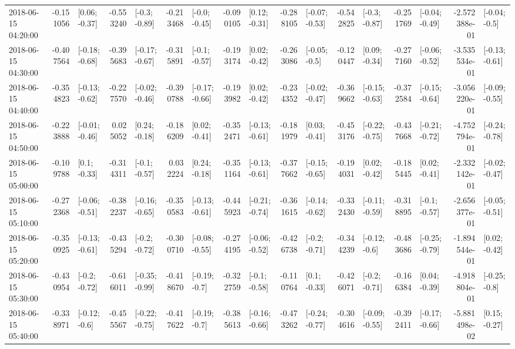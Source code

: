 \begin{tabular}{lrlrlrlrlrlrlrlrl}
2018-06-15 04:20:00 & -0.151056 &   [0.06; -0.37] & -0.553240 &   [-0.3; -0.89] & -0.213468 &   [-0.0; -0.45] & -0.090105 &   [0.12; -0.31] & -0.288105 &  [-0.07; -0.53] & -0.542825 &   [-0.3; -0.87] & -0.251769 &  [-0.04; -0.49] & -2.572388e-01 &   [-0.04; -0.5] \\
2018-06-15 04:30:00 & -0.407564 &  [-0.18; -0.68] & -0.395683 &  [-0.17; -0.67] & -0.315891 &   [-0.1; -0.57] & -0.193174 &   [0.02; -0.42] & -0.263086 &   [-0.05; -0.5] & -0.120447 &   [0.09; -0.34] & -0.277160 &  [-0.06; -0.52] & -3.535534e-01 &  [-0.13; -0.61] \\
2018-06-15 04:40:00 & -0.354823 &  [-0.13; -0.62] & -0.227570 &  [-0.02; -0.46] & -0.390788 &  [-0.17; -0.66] & -0.193982 &   [0.02; -0.42] & -0.234352 &  [-0.02; -0.47] & -0.369662 &  [-0.15; -0.63] & -0.372584 &  [-0.15; -0.64] & -3.056220e-01 &  [-0.09; -0.55] \\
2018-06-15 04:50:00 & -0.223888 &  [-0.01; -0.46] &  0.025052 &   [0.24; -0.18] & -0.186209 &   [0.02; -0.41] & -0.352471 &  [-0.13; -0.61] & -0.181979 &   [0.03; -0.41] & -0.453176 &  [-0.22; -0.75] & -0.437668 &  [-0.21; -0.72] & -4.752794e-01 &  [-0.24; -0.78] \\
2018-06-15 05:00:00 & -0.109788 &    [0.1; -0.33] & -0.314311 &   [-0.1; -0.57] &  0.032224 &   [0.24; -0.18] & -0.351164 &  [-0.13; -0.61] & -0.377662 &  [-0.15; -0.65] & -0.194031 &   [0.02; -0.42] & -0.185445 &   [0.02; -0.41] & -2.332142e-01 &  [-0.02; -0.47] \\
2018-06-15 05:10:00 & -0.272368 &  [-0.06; -0.51] & -0.382237 &  [-0.16; -0.65] & -0.350583 &  [-0.13; -0.61] & -0.445923 &  [-0.21; -0.74] & -0.361615 &  [-0.14; -0.62] & -0.332430 &  [-0.11; -0.59] & -0.318895 &   [-0.1; -0.57] & -2.656377e-01 &  [-0.05; -0.51] \\
2018-06-15 05:20:00 & -0.350925 &  [-0.13; -0.61] & -0.435294 &   [-0.2; -0.72] & -0.300710 &  [-0.08; -0.55] & -0.274195 &  [-0.06; -0.52] & -0.426738 &   [-0.2; -0.71] & -0.344239 &   [-0.12; -0.6] & -0.483686 &  [-0.25; -0.79] & -1.894544e-01 &   [0.02; -0.42] \\
2018-06-15 05:30:00 & -0.430954 &   [-0.2; -0.72] & -0.616011 &  [-0.35; -0.99] & -0.418670 &   [-0.19; -0.7] & -0.322759 &   [-0.1; -0.58] & -0.110764 &    [0.1; -0.33] & -0.426071 &   [-0.2; -0.71] & -0.166384 &   [0.04; -0.39] & -4.918804e-01 &   [-0.25; -0.8] \\
2018-06-15 05:40:00 & -0.338971 &   [-0.12; -0.6] & -0.455567 &  [-0.22; -0.75] & -0.417622 &   [-0.19; -0.7] & -0.385613 &  [-0.16; -0.66] & -0.473262 &  [-0.24; -0.77] & -0.304616 &  [-0.09; -0.55] & -0.392411 &  [-0.17; -0.66] & -5.881498e-02 &   [0.15; -0.27] \\

\end{tabular}
